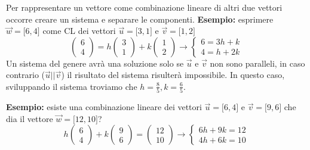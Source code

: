 \documentclass[../main.tex]{subfiles}
\begin{document}
Per rappresentare un vettore come combinazione lineare di altri due vettori occorre creare un sistema e separare le componenti.
\textbf{Esempio:} esprimere $\vec{w}= \lbrack6,4\rbrack$ come CL dei vettori $\vec{u}=\lbrack3,1\rbrack$ e $\vec{v}=\lbrack1,2\rbrack$
$$
    \begin{pmatrix}
        6 \\
        4
    \end{pmatrix}
    = h \begin{pmatrix}
        3 \\
        1
    \end{pmatrix}
    +k \begin{pmatrix}
        1 \\
        2
    \end{pmatrix} \rightarrow
    \begin{cases}
        6 = 3h+k \\
        4 = h+2k
    \end{cases}
$$
Un sistema del genere avrà una soluzione solo se $\vec{u}$ e $\vec{v}$ non sono paralleli, in caso contrario ($\vec{u} || \vec{v}$) il risultato del sistema risulterà impossibile.
In questo caso, sviluppando il sistema troviamo che $h = \frac{8}{5}, k=\frac{6}{5}$.
\pagebreak

\textbf{Esempio:} esiste una combinazione lineare dei vettori $\vec{u}= \lbrack6,4\rbrack$ e $\vec{v}= \lbrack9,6\rbrack$ che dia il vettore $\vec{w}= \lbrack12,10\rbrack$?
$$
    h \begin{pmatrix}
        6 \\
        4
    \end{pmatrix}
    +k \begin{pmatrix}
        9 \\
        6
    \end{pmatrix}
    = \begin{pmatrix}
       12 \\
       10
    \end{pmatrix} \rightarrow
    \begin{cases}
        6h+9k=12 \\
        4h+6k=10
    \end{cases}
$$
\end{document}

